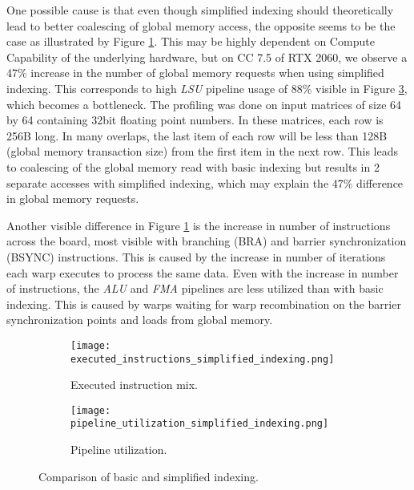 One possible cause is that even though simplified indexing should theoretically lead to better coalescing of global memory access, the opposite seems to be the case as illustrated by Figure \ref{fig:executed_instructions_simplified_indexing}. This may be highly dependent on Compute Capability of the underlying hardware, but on CC 7.5 of RTX 2060, we observe a 47\% increase in the number of global memory requests when using simplified indexing. This corresponds to high \textit{LSU} pipeline usage of 88\% visible in Figure \ref{fig:pipeline_utilization_simplified_indexing}, which becomes a bottleneck. The profiling was done on input matrices of size 64 by 64 containing 32bit floating point numbers. In these matrices, each row is 256B long. In many overlaps, the last item of each row will be less than 128B (global memory transaction size) from the first item in the next row. This leads to coalescing of the global memory read with basic indexing but results in 2 separate accesses with simplified indexing, which may explain the 47\% difference in global memory requests.

Another visible difference in Figure \ref{fig:executed_instructions_simplified_indexing} is the increase in number of instructions across the board, most visible with branching (BRA) and barrier synchronization (BSYNC) instructions. This is caused by the increase in number of iterations each warp executes to process the same data. Even with the increase in number of instructions, the \textit{ALU} and \textit{FMA} pipelines are less utilized than with basic indexing. This is caused by warps waiting for warp recombination on the barrier synchronization points and loads from global memory.


\begin{figure}[ht]
	\centering	
	\begin{subfigure}{0.8\textwidth}
		\centering
		\texttt{[image: executed\_instructions\_simplified\_indexing.png]}
		\caption{Executed instruction mix.}
		\label{fig:executed_instructions_simplified_indexing}
	\end{subfigure}
	\hfill
	\begin{subfigure}{0.8\textwidth}
		\centering
		\texttt{[image: pipeline\_utilization\_simplified\_indexing.png]}
		\caption{Pipeline utilization.}
		\label{fig:pipeline_utilization_simplified_indexing}
	\end{subfigure}
	
	\caption{Comparison of basic and simplified indexing.}
\end{figure}

